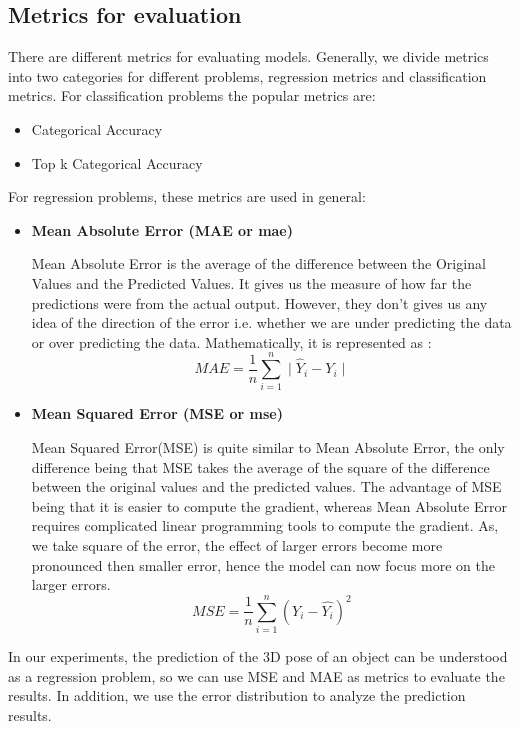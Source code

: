 \subsection{Metrics for evaluation}
There are different metrics for evaluating models. Generally, we divide metrics into two categories for different problems, regression metrics and classification metrics. For classification problems the popular metrics are:
\begin{itemize}
	\item Categorical Accuracy
	\item Top k Categorical Accuracy
\end{itemize}

For regression problems, these metrics are used in general:
\begin{itemize}
	\item \textbf{Mean Absolute Error (MAE or mae)}
	
	Mean Absolute Error is the average of the difference between the Original Values and the Predicted Values. It gives us the measure of how far the predictions were from the actual output. However, they don’t gives us any idea of the direction of the error i.e. whether we are under predicting the data or over predicting the data. Mathematically, it is represented as :
	\begin{equation}
		MAE = \frac{1}{n}\sum_{i=1}^{n}\mid \hat {Y}_{i}-Y_{i}\mid
	\end{equation}
	
	\item \textbf{Mean Squared Error (MSE or mse) }
	
	Mean Squared Error(MSE) is quite similar to Mean Absolute Error, the only difference being that MSE takes the average of the square of the difference between the original values and the predicted values. The advantage of MSE being that it is easier to compute the gradient, whereas Mean Absolute Error requires complicated linear programming tools to compute the gradient. As, we take square of the error, the effect of larger errors become more pronounced then smaller error, hence the model can now focus more on the larger errors.
	\begin{equation}
		MSE = \frac{1}{n} \sum _{i=1}^{n}(Y_{i}-\hat {Y_{i}})^{2}
	\end{equation}
\end{itemize}

In our experiments, the prediction of the 3D pose of an object can be understood as a regression problem, so we can use MSE and MAE as metrics to evaluate the results. In addition, we use the error distribution to analyze the prediction results. 

